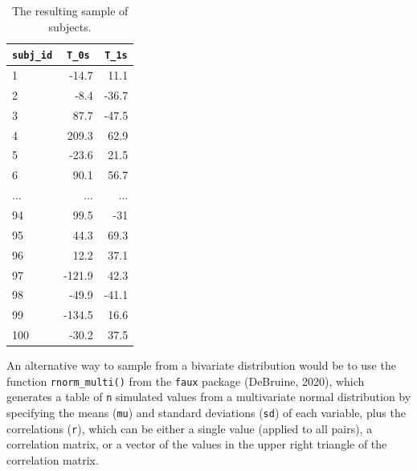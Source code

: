 \documentclass[
  english,
  doc,floatsintext]{apa6}
\begin{document}
\begin{table}[H]

\begin{center}
\begin{threeparttable}

\caption{\label{tab:subj-table}The resulting sample of subjects.}

\begin{tabular}{lrr}
\toprule
\texttt{subj\_id} & \multicolumn{1}{c}{\texttt{T\_0s}} & \multicolumn{1}{c}{\texttt{T\_1s}}\\
\midrule
1 & -14.7 & 11.1\\
2 & -8.4 & -36.7\\
3 & 87.7 & -47.5\\
4 & 209.3 & 62.9\\
5 & -23.6 & 21.5\\
6 & 90.1 & 56.7\\
... & ... & ...\\
94 & 99.5 & -31\\
95 & 44.3 & 69.3\\
96 & 12.2 & 37.1\\
97 & -121.9 & 42.3\\
98 & -49.9 & -41.1\\
99 & -134.5 & 16.6\\
100 & -30.2 & 37.5\\
\bottomrule
\end{tabular}

\end{threeparttable}
\end{center}

\end{table}

An alternative way to sample from a bivariate distribution would be to use the function \texttt{rnorm\_multi()} from the \texttt{faux} package (DeBruine, 2020), which generates a table of \texttt{n} simulated values from a multivariate normal distribution by specifying the means (\texttt{mu}) and standard deviations (\texttt{sd}) of each variable, plus the correlations (\texttt{r}), which can be either a single value (applied to all pairs), a correlation matrix, or a vector of the values in the upper right triangle of the correlation matrix.
\end{document}
